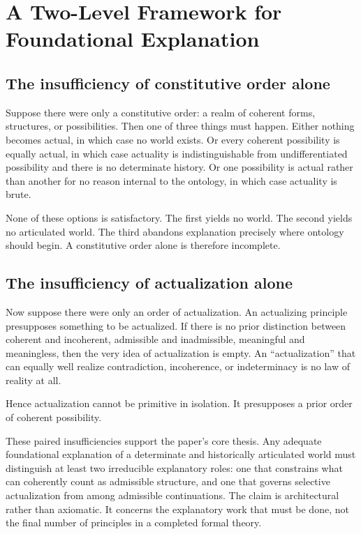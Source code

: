 \documentclass[11pt]{article}
\theoremstyle{foundation}
\begin{document}
\section{A Two-Level Framework for Foundational Explanation}

\subsection{The insufficiency of constitutive order alone}

Suppose there were only a constitutive order: a realm of coherent forms, structures, or possibilities. Then one of three things must happen. Either nothing becomes actual, in which case no world exists. Or every coherent possibility is equally actual, in which case actuality is indistinguishable from undifferentiated possibility and there is no determinate history. Or one possibility is actual rather than another for no reason internal to the ontology, in which case actuality is brute.

None of these options is satisfactory. The first yields no world. The second yields no articulated world. The third abandons explanation precisely where ontology should begin. A constitutive order alone is therefore incomplete.

\subsection{The insufficiency of actualization alone}

Now suppose there were only an order of actualization. An actualizing principle presupposes something to be actualized. If there is no prior distinction between coherent and incoherent, admissible and inadmissible, meaningful and meaningless, then the very idea of actualization is empty. An ``actualization'' that can equally well realize contradiction, incoherence, or indeterminacy is no law of reality at all.

Hence actualization cannot be primitive in isolation. It presupposes a prior order of coherent possibility.

These paired insufficiencies support the paper's core thesis. Any adequate foundational explanation of a determinate and historically articulated world must distinguish at least two irreducible explanatory roles: one that constrains what can coherently count as admissible structure, and one that governs selective actualization from among admissible continuations. The claim is architectural rather than axiomatic. It concerns the explanatory work that must be done, not the final number of principles in a completed formal theory.
\end{document}
